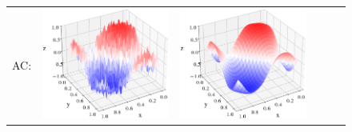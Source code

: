 \documentclass[12pt, reqno]{report}
\theoremstyle{definition}
\theoremstyle{remark}
\begin{document}
\begin{figure}[H]
\begin{tabular}{rccccc}
        AC: &
        \includegraphics[align = c, height=\subheight]{media_paper/AC_surf_FD_n=0.png} &
        \includegraphics[align = c, height=\subheight]{media_paper/AC_surf_FD_n=50.png} &

\end{tabular}
\end{figure}
\end{document}
